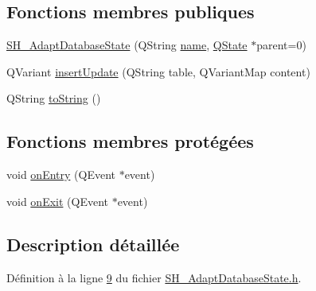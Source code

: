 \subsection*{Fonctions membres publiques}
\begin{DoxyCompactItemize}
\item 
\hyperlink{classSH__AdaptDatabaseState_aaca9bab6a7263320c40149987b82c024}{S\-H\-\_\-\-Adapt\-Database\-State} (Q\-String \hyperlink{classSH__NamedObject_a970f265df31b28b2179bbbceb6170ac2}{name}, \hyperlink{classQState}{Q\-State} $\ast$parent=0)
\item 
Q\-Variant \hyperlink{classSH__AdaptDatabaseState_ab010e64da052db416328d3bcb9ca01d4}{insert\-Update} (Q\-String table, Q\-Variant\-Map content)
\item 
Q\-String \hyperlink{classSH__GenericState_a5480c5ee725fd801d8f6292cd4c803b8}{to\-String} ()
\end{DoxyCompactItemize}
\subsection*{Fonctions membres protégées}
\begin{DoxyCompactItemize}
\item 
void \hyperlink{classSH__GenericState_a7c30692635023ce7cf65e5ba5bb18a9c}{on\-Entry} (Q\-Event $\ast$event)
\item 
void \hyperlink{classSH__GenericState_accf3326011661417fb0ca0eede3ed9a1}{on\-Exit} (Q\-Event $\ast$event)
\end{DoxyCompactItemize}


\subsection{Description détaillée}


Définition à la ligne \hyperlink{SH__AdaptDatabaseState_8h_source_l00009}{9} du fichier \hyperlink{SH__AdaptDatabaseState_8h_source}{S\-H\-\_\-\-Adapt\-Database\-State.\-h}.



